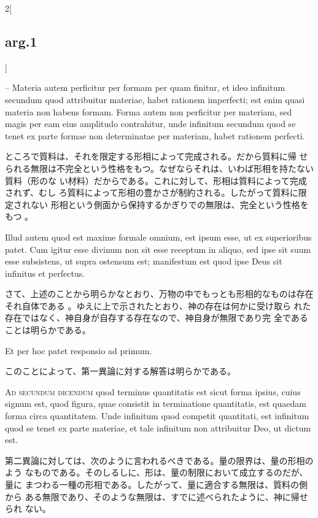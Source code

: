 \documentclass[paper=a4paper,fontsize=10pt,jafontsize=9pt,titlepage]{jlreq}
\begin{document}
\begin{paracol}{2}[\subsection{arg.1}]
\switchcolumn*

-- Materia autem perficitur per formam per quam finitur, et ideo infinitum
secundum quod attribuitur materiae, habet rationem imperfecti; est enim
quasi materia non habens formam. Forma autem non perficitur per
materiam, sed magis per eam eius amplitudo contrahitur, unde infinitum
secundum quod se tenet ex parte formae non determinatae per materiam,
habet rationem perfecti.

\switchcolumn

ところで質料は、それを限定する形相によって完成される。だから質料に帰
せられる無限は不完全という性格をもつ。なぜならそれは、いわば形相を持たない質料（形のな
 い材料）だからである。これに対して、形相は質料によって完成されず、むし
 ろ質料によって形相の豊かさが制約される。したがって質料に限定されない
 形相という側面から保持するかぎりでの無限は、完全という性格をもつ 。

\switchcolumn*

Illud autem quod est maxime formale omnium, est ipsum esse, ut ex
superioribus patet. Cum igitur esse divinum non sit esse receptum in
aliquo, sed ipse sit suum esse subsistens, ut supra ostensum est;
manifestum est quod ipse Deus sit infinitus et perfectus.

\switchcolumn

さて、上述のことから明らかなとおり、万物の中でもっとも形相的なものは存在
それ自体である 。ゆえに上で示されたとおり、神の存在は何かに受け取ら
れた存在ではなく、神自身が自存する存在なので、神自身が無限であり完
全であることは明らかである。

\switchcolumn*

Et per hoc patet responsio ad primum.

\switchcolumn

このことによって、第一異論に対する解答は明らかである。

\switchcolumn*[\subsection{ad.2}]

{\scshape Ad secundum dicendum} quod terminus quantitatis est sicut forma ipsius,
cuius signum est, quod figura, quae consistit in terminatione
quantitatis, est quaedam forma circa quantitatem. Unde infinitum quod
competit quantitati, est infinitum quod se tenet ex parte materiae, et
tale infinitum non attribuitur Deo, ut dictum est.

\switchcolumn

第二異論に対しては、次のように言われるべきである。量の限界は、量の形相のよう
なものである。そのしるしに、形は、量の制限において成立するのだが、量に
まつわる一種の形相である。したがって、量に適合する無限は、質料の側から
ある無限であり、そのような無限は、すでに述べられたように、神に帰せられ
ない。


\end{paracol}
\end{document}
